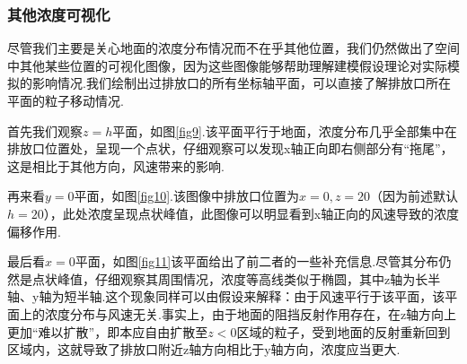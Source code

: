 \documentclass{article}
\begin{document}
	\subsubsection{其他浓度可视化}
	尽管我们主要是关心地面的浓度分布情况而不在乎其他位置，我们仍然做出了空间中其他某些位置的可视化图像，因为这些图像能够帮助理解建模假设理论对实际模拟的影响情况.我们绘制出过排放口的所有坐标轴平面，可以直接了解排放口所在平面的粒子移动情况.
	\par 首先我们观察$z=h$平面，如图\ref{fig9}.该平面平行于地面，浓度分布几乎全部集中在排放口位置处，呈现一个点状，仔细观察可以发现x轴正向即右侧部分有“拖尾”，这是相比于其他方向，风速带来的影响.
	\par 再来看$y=0$平面，如图\ref{fig10}.该图像中排放口位置为$x=0, z=20$（因为前述默认$h=20$），此处浓度呈现点状峰值，此图像可以明显看到x轴正向的风速导致的浓度偏移作用.
	\par 最后看$x=0$平面，如图\ref{fig11}该平面给出了前二者的一些补充信息.尽管其分布仍然是点状峰值，仔细观察其周围情况，浓度等高线类似于椭圆，其中z轴为长半轴、y轴为短半轴.这个现象同样可以由假设来解释：由于风速平行于该平面，该平面上的浓度分布与风速无关.事实上，由于地面的阻挡反射作用存在，在z轴方向上更加“难以扩散”，即本应自由扩散至$z<0$区域的粒子，受到地面的反射重新回到区域内，这就导致了排放口附近z轴方向相比于y轴方向，浓度应当更大.
	
\end{document}
